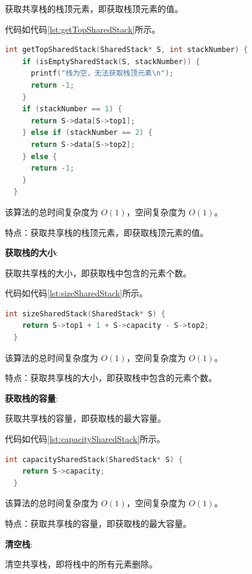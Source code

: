 \documentclass[lang=cn,newtx,10pt,scheme=chinese]{../elegantbook}
\begin{document}
获取共享栈的栈顶元素，即获取栈顶元素的值。

代码如代码\ref{lst:getTopSharedStack}所示。

\begin{lstlisting}[language=C++, caption={获取共享栈的栈顶元素示例代码}, label={lst:getTopSharedStack}]
  int getTopSharedStack(SharedStack* S, int stackNumber) {
    if (isEmptySharedStack(S, stackNumber)) {
      printf("栈为空，无法获取栈顶元素\n");
      return -1;
    }
    if (stackNumber == 1) {
      return S->data[S->top1];
    } else if (stackNumber == 2) {
      return S->data[S->top2];
    } else {
      return -1;
    }
  }

\end{lstlisting}

该算法的总时间复杂度为 $O(1)$，空间复杂度为 $O(1)$。

特点：获取共享栈的栈顶元素，即获取栈顶元素的值。

\textbf{获取栈的大小}:

获取共享栈的大小，即获取栈中包含的元素个数。

代码如代码\ref{lst:sizeSharedStack}所示。

\begin{lstlisting}[language=C++, caption={获取共享栈的大小示例代码}, label={lst:sizeSharedStack}]
  int sizeSharedStack(SharedStack* S) {
    return S->top1 + 1 + S->capacity - S->top2;
  }

\end{lstlisting}

该算法的总时间复杂度为 $O(1)$，空间复杂度为 $O(1)$。

特点：获取共享栈的大小，即获取栈中包含的元素个数。

\textbf{获取栈的容量}:

获取共享栈的容量，即获取栈的最大容量。

代码如代码\ref{lst:capacitySharedStack}所示。

\begin{lstlisting}[language=C++, caption={获取共享栈的容量示例代码}, label={lst:capacitySharedStack}]
  int capacitySharedStack(SharedStack* S) {
    return S->capacity;
  }

\end{lstlisting}

该算法的总时间复杂度为 $O(1)$，空间复杂度为 $O(1)$。

特点：获取共享栈的容量，即获取栈的最大容量。

\textbf{清空栈}:

清空共享栈，即将栈中的所有元素删除。
\end{document}
